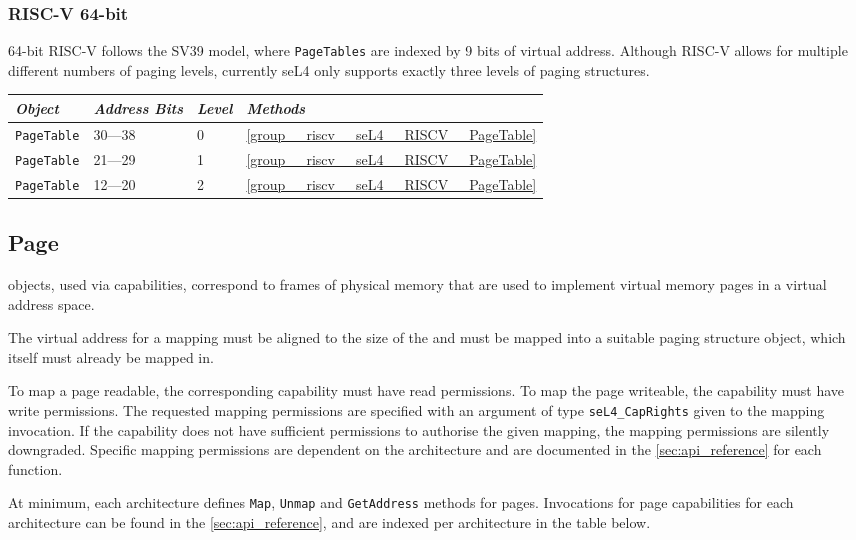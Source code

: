 \subsubsection{RISC-V 64-bit}

64-bit RISC-V follows the SV39 model, where \texttt{PageTables} are indexed by 9 bits of virtual address.
Although RISC-V allows
for multiple different numbers of paging levels, currently seL4 only supports exactly three levels
of paging structures.

\begin{tabularx}{\textwidth}{Xlll} \toprule
\emph{Object}          & \emph{Address Bits} & \emph{Level} & \emph{Methods} \\ \midrule
\texttt{PageTable}     & 30---38             & 0            & \autoref{group__riscv__seL4__RISCV__PageTable} \\
\texttt{PageTable}     & 21---29             & 1            & \autoref{group__riscv__seL4__RISCV__PageTable} \\
\texttt{PageTable}     & 12---20             & 2            & \autoref{group__riscv__seL4__RISCV__PageTable} \\
\bottomrule
\end{tabularx}

\subsection{Page}

 objects, used via  capabilities, correspond to frames of physical memory that
are used to implement virtual memory pages in a virtual address space.

The virtual address for a  mapping must be aligned to the size of the  and must
be mapped into a suitable paging structure object, which itself must already be mapped in.

To map a page readable, the corresponding  capability must have read permissions. To map
the page writeable, the capability must have write permissions. The requested mapping permissions
are specified with an argument of type \texttt{seL4\_CapRights} given to the mapping invocation. If
the capability does not have sufficient permissions to authorise the given mapping, the mapping
permissions are silently downgraded. Specific mapping permissions are dependent on the architecture
and are documented in the \autoref{sec:api_reference} for each function.

At minimum, each architecture defines \texttt{Map}, \texttt{Unmap} and
\texttt{GetAddress} methods for pages.
Invocations for page capabilities for each architecture can be found in the \autoref{sec:api_reference}, and
are indexed per architecture in the table below.

